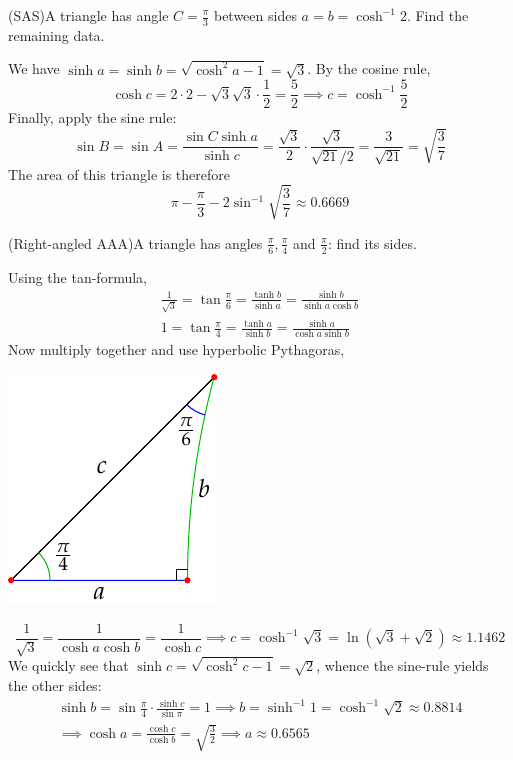 \begin{examples}{}{}
	\exstart (SAS)\quad A triangle has angle $C=\frac{\pi}3$ between sides $a=b=\cosh^{-1}2$. Find the remaining data.
	\begin{enumerate}\setcounter{enumi}{1}
	 	\item[] We have $\sinh a=\sinh b=\sqrt{\cosh^2\!a-1}=\sqrt 3$. By the cosine rule,
		\[
			\cosh c=2\cdot 2-\sqrt 3\sqrt 3\cdot \frac 12 =\frac 52\implies c=\cosh^{-1}\frac 52
		\]
		Finally, apply the sine rule:
		\[
			\sin B=\sin A=\frac{\sin C\sinh a}{\sinh c}=\frac{\sqrt 3}2\cdot\frac{\sqrt 3}{\sqrt{21}/2}=\frac 3{\sqrt{21}}=\sqrt{\frac 37}
		\]
	 	The area of this triangle is therefore
	 	\[
	 		\pi-\frac{\pi}3-2\sin^{-1}\sqrt{\frac 37}\approx 0.6669
	 	\]
	 	
	 	\item (Right-angled AAA)\lstsp A triangle has angles $\frac\pi 6,\frac\pi 4$ and $\frac\pi 2$: find its sides.\smallbreak
	  \begin{minipage}[t]{0.71\linewidth}\vspace{-10pt}
	  	\item[] Using the tan-formula,
		  \begin{gather*}
		  	\frac 1{\sqrt 3}=\tan\frac\pi 6=\frac{\tanh b}{\sinh a}=\frac{\sinh b}{\sinh a\cosh b}\\
		  	1=\tan\frac\pi 4=\frac{\tanh a}{\sinh b}=\frac{\sinh a}{\cosh a\sinh b}
		  \end{gather*}
		  Now multiply together and use hyperbolic Pythagoras,
	  \end{minipage}
	  \hfill
	  \begin{minipage}[t]{0.28\linewidth}\vspace{-20pt}
	  	\flushright\includegraphics{isom-right2}
	  \end{minipage}\par
	  \[
	  	\frac 1{\sqrt 3}=\frac 1{\cosh a\cosh b}=\frac 1{\cosh c}\implies c=\cosh^{-1}\sqrt 3=\ln(\sqrt 3+\sqrt 2)\approx 1.1462
	  \]
	  We quickly see that $\sinh c=\sqrt{\cosh^2c-1}=\sqrt 2$, whence the sine-rule yields the other sides:
	  \begin{gather*}
		  \sinh b=\sin\frac\pi 4\cdot\frac{\sinh c}{\sin\pi}=1 \implies b=\sinh^{-1} 1 =\cosh^{-1}\sqrt 2\approx 0.8814\\
		  \implies \cosh a=\frac{\cosh c}{\cosh b}=\sqrt{\frac 32} \implies a\approx 0.6565
	  \end{gather*}
	\end{enumerate}
\end{examples}





